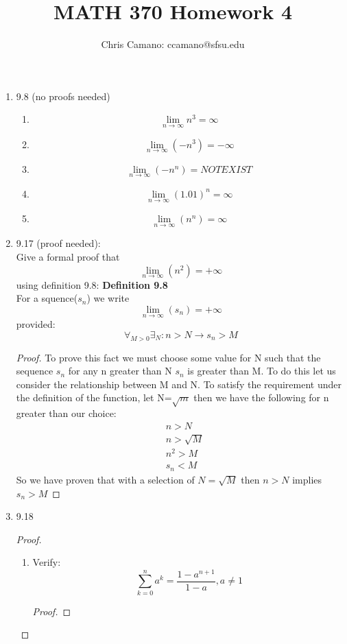 \documentclass[11pt]{article}
\author{Chris Camano: ccamano@sfsu.edu}
\title{MATH 370  Homework 4}
\date
\theoremstyle{definition}  %
\newcommand{\nlim}{\lim_{n\rightarrow \infty}}
\begin{document}
\maketitle
\begin{enumerate}
  \item 9.8 (no proofs needed)
  \begin{enumerate}
    \item
    \[
      \nlim n^3=\infty
    \]
    \item
    \[
      \nlim (-n^3)=-\infty
    \]
    \item
    \[
      \nlim (-n^n)=NOT EXIST
    \]
    \item
      \[
        \nlim (1.01)^n=\infty
      \]
    \item
    \[
      \nlim(n^n)=\infty
    \]
  \end{enumerate}
  \item  9.17 (proof needed):\\
  Give a formal proof that
  \[
    \lim_{n\rightarrow \infty}(n^2)=+\infty
  \]
  using definition 9.8:
  \textbf{Definition 9.8}\\
  For a squence($s_n$) we write $$\nlim(s_n)=+\infty$$ provided: $$\forall_{M>0}\exists_{N}:n>N\rightarrow s_n>M$$
  \begin{proof}
    To prove this fact we must choose some value for N such that the sequence $s_n$ for any n greater than N $s_n$ is greater than M. To do this let us consider the relationship between M and N. To satisfy the requirement under the definition of the function, let N=$\sqrt{m}$ then we have the following for n greater than our choice:
    \begin{align*}
      &n>N\\
      &n>\sqrt{M}\\
      &n^2> M\\
      &s_n<M
    \end{align*}
    So we have proven that with a selection of $N=\sqrt{M}$ then $n>N$ implies $s_n>M$
  \end{proof}
  \item 9.18
  \begin{proof}
    \begin{enumerate}
      \item Verify:
      \[
        \sum_{k=0}^na^k=\frac{1-a^{n+1}}{1-a}, a\neq 1
      \]
      \begin{proof}

\end{proof}
\end{enumerate}
\end{proof}
\end{enumerate}
\end{document}
